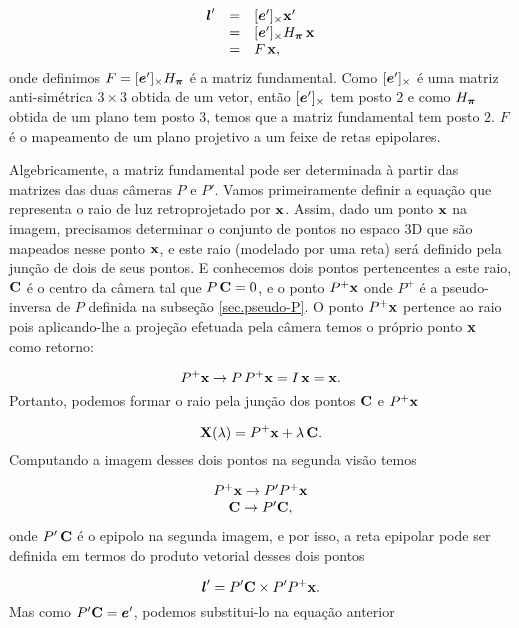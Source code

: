 \begin{equation*}
\begin{array}{rcl}
\boldsymbol{l}'&=&[\boldsymbol{e}']_\times\mathbf{x}'\\
&=&[\boldsymbol{e}']_\times H_{\boldsymbol{\pi}} \,\mathbf{x}\\
&=&F\,\mathbf{x},
\end{array}
\end{equation*} 
onde definimos $F=[\boldsymbol{e}']_\times H_{\boldsymbol{\pi}}$ é a matriz fundamental. Como $[\boldsymbol{e}']_\times$ é uma matriz anti-simétrica $3\times3$ obtida de um vetor, então  $[\boldsymbol{e}']_\times$ tem posto $2$ e como $H_{\boldsymbol{\pi}}$ obtida de um plano tem posto $3$, temos que a matriz fundamental tem posto $2$. $F$ é o mapeamento de um plano projetivo a um feixe de retas epipolares.


Algebricamente, a matriz fundamental pode ser determinada à partir das matrizes das duas câmeras $P$ e $P'$. Vamos primeiramente definir a equação que representa o raio de luz retroprojetado por $\mathbf{x}$. Assim, dado um ponto $\mathbf{x}$ na imagem, precisamos determinar o conjunto de pontos no espaco 3D que são mapeados nesse ponto $\mathbf{x}$, e este raio (modelado por uma reta) será definido pela junção de dois de seus pontos. E conhecemos dois pontos pertencentes a este raio, ${\bf C}$ é o centro da câmera tal que $P\,{\bf C}=0$, e o ponto $P^+\mathbf{x}$ onde $P^+$ é a pseudo-inversa de $P$ definida na subseção \ref{sec.pseudo-P}. O ponto $P^+\mathbf{x}$ pertence ao raio pois aplicando-lhe a projeção efetuada pela câmera temos o próprio ponto $\mathbf{x}$ como retorno:

\begin{equation*}
P^+\mathbf{x} \rightarrow P\,P^+\mathbf{x}=I\,\mathbf{x}=\mathbf{x}.
\end{equation*}
Portanto, podemos formar o raio pela junção dos pontos ${\bf C}$ e $P^+\mathbf{x}$

\begin{equation*}
\mathbf{X}(\lambda)=P^+\mathbf{x}+\lambda\,{\bf C}.
\end{equation*}
Computando a imagem desses dois pontos na segunda visão temos

\begin{equation*}
\begin{array}{c}
P^+\mathbf{x} \rightarrow P'P^+\mathbf{x}\\
{\bf C} \rightarrow P'{\bf C},
\end{array}
\end{equation*}
onde $P'\,{\bf C}$ é o epipolo na segunda imagem, e por isso, a reta epipolar pode ser definida em termos do produto vetorial desses dois pontos

\begin{equation}\label{eq.reta-epipolar-funcao-cameras}
\boldsymbol{l}'=P'{\bf C} \times P'P^+\mathbf{x}.
\end{equation}
Mas como $P'{\bf C}=\boldsymbol{e}'$, podemos substitui-lo na equação anterior

